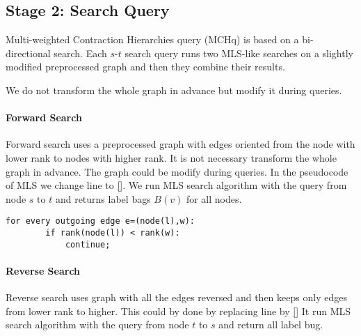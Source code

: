 
\subsection{Stage 2: Search Query}
\label{subsecStage2}

Multi-weighted Contraction Hierarchies query (MCHq) is based on a bi-directional search.
Each $s$-$t$ search query runs two MLS-like searches on a slightly modified preprocessed graph
and then they combine their results.

We do not transform the whole graph in advance but modify it during queries.

\paragraph*{Forward Search}
Forward search uses a preprocessed graph with edges oriented from the node with lower rank to nodes with higher rank. 
It is not necessary transform the whole graph in advance. 
The graph could be modify during queries.
In the pseudocode of MLS we change line  to \ref{}.
We run MLS search algorithm with the query from node $s$ to $t$ and returns label bags $B(v)$ for all nodes.

\begin{lstlisting}[caption={Forward Search},label=list:8-6,captionpos=t,float,abovecaptionskip=-\medskipamount]
    for every outgoing edge e=(node(l),w):
    	if rank(node(l)) < rank(w):
        	continue;
\end{lstlisting}

\paragraph*{Reverse Search}
Reverse search uses graph with all the edges reversed and then keeps only edges
from lower rank to higher. 
This could by done by replacing line  by \ref{}
It run MLS search algorithm with the query from node $t$ to $s$ and return all label bug.


